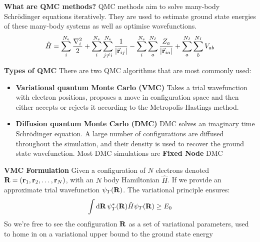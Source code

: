\documentclass[10pt]{beamer}
\begin{document}
\begin{frame}[allowframebreaks]
    \textbf{What are QMC methods?}\medskip\newline
    QMC methods aim to solve many-body Schr\"odinger equations iteratively. They are used to estimate ground state energies of these many-body systems as well as optimise wavefunctions.\medskip\newline
    \begin{equation}
        \hat{H}=\sum\limits_{i}^{N_e}\frac{\nabla_i^2}{2}+\sum\limits_{i}^{N_e}\sum\limits_{j\neq i}^{N_e}\frac{1}{\vqty{\va{r}_{ij}}}-\sum\limits_{i}^{N_e}\sum\limits_{a}^{N_I}\frac{Z_a}{\vqty{\va{r}_{ia}}}+\sum\limits_a^{N_I}\sum\limits_b^{N_I}V_{ab}
    \end{equation}
    \framebreak%

    \textbf{Types of QMC}\medskip\newline
    There are two QMC algorithms that are most commonly used:
    \begin{itemize}
        \item[\textbullet] \textbf{Variational quantum Monte Carlo (VMC)}\newline
        Takes a trial wavefunction with electron positions, proposes a move in configuration space and then either accepts or rejects it according to the Metropolis-Hastings method.\newline
        \item[\textbullet] \textbf{Diffusion quantum Monte Carlo (DMC)}\newline
        DMC solves an imaginary time Schr\"odinger equation. A large number of configurations are diffused throughout the simulation, and their density is used to recover the ground state wavefunction. Most DMC simulations are \textbf{Fixed Node} DMC
    \end{itemize}
    \framebreak%

    \textbf{VMC Formulation}\medskip\newline
    Given a configuration of $N$ electrons denoted $\vb{R}=\pqty{\vb{r}_1,\vb{r}_2,\ldots,\vb{r}_N}$, with an $N$ body Hamiltonian $\hat{H}$.\newline
    If we provide an approximate trial wavefunction $\psi_T\pqty{\vb{R}}$. The variational principle ensures:
    \begin{equation}
        \int\dd{\vb{R}}\psi_T^*\pqty{\vb{R}}\hat{H}\psi_T\pqty{\vb{R}}\geq E_0
    \end{equation}
    So we're free to see the configuration $\vb{R}$ as a set of variational parameters, used to home in on a variational upper bound to the ground state energy
    \framebreak%


\end{frame}
\end{document}
